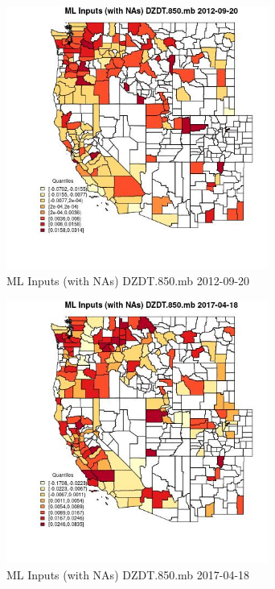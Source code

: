 \begin{figure} 
\centering  
\includegraphics[width=0.77\textwidth]{Code_Outputs/Report_ML_input_PM25_Step4_part_e_de_duplicated_aves_compiled_2019-05-14wNAs_CountyDZDT850mbMean2012-09-20_2012-09-20.jpg} 
\caption{\label{fig:Report_ML_input_PM25_Step4_part_e_de_duplicated_aves_compiled_2019-05-14wNAsCountyDZDT850mbMean2012-09-20_2012-09-20}ML Inputs (with NAs) DZDT.850.mb 2012-09-20} 
\end{figure} 
 

\begin{figure} 
\centering  
\includegraphics[width=0.77\textwidth]{Code_Outputs/Report_ML_input_PM25_Step4_part_e_de_duplicated_aves_compiled_2019-05-14wNAs_CountyDZDT850mbMean2017-04-18_2017-04-18.jpg} 
\caption{\label{fig:Report_ML_input_PM25_Step4_part_e_de_duplicated_aves_compiled_2019-05-14wNAsCountyDZDT850mbMean2017-04-18_2017-04-18}ML Inputs (with NAs) DZDT.850.mb 2017-04-18} 
\end{figure} 
 

